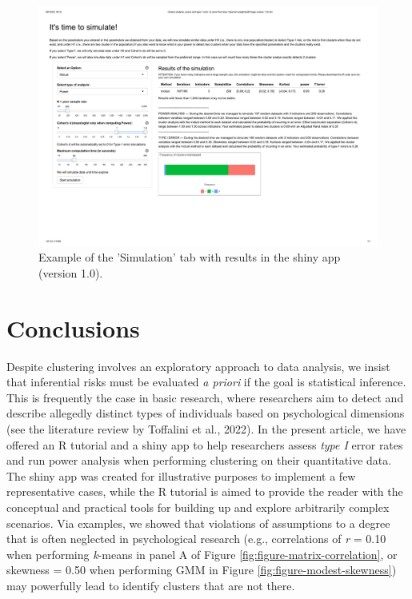 \documentclass[
  man,floatsintext]{apa6}
\begin{document}
\begin{figure}

{\centering \includegraphics[width=1\linewidth]{figures_external/Figure_Simulation_shiny} 

}

\caption{Example of the 'Simulation' tab with results in the shiny app (version 1.0).}\label{fig:figure-simulation-shiny}
\end{figure}

\hypertarget{conclusions}{%
\section{Conclusions}\label{conclusions}}

Despite clustering involves an exploratory approach to data analysis, we insist that inferential risks must be evaluated \emph{a priori} if the goal is statistical inference. This is frequently the case in basic research, where researchers aim to detect and describe allegedly distinct types of individuals based on psychological dimensions (see the literature review by Toffalini et al., 2022). In the present article, we have offered an R tutorial and a shiny app to help researchers assess \emph{type I} error rates and run power analysis when performing clustering on their quantitative data. The shiny app was created for illustrative purposes to implement a few representative cases, while the R tutorial is aimed to provide the reader with the conceptual and practical tools for building up and explore arbitrarily complex scenarios. Via examples, we showed that violations of assumptions to a degree that is often neglected in psychological research (e.g., correlations of \emph{r} = 0.10 when performing \emph{k}-means in panel A of Figure \ref{fig:figure-matrix-correlation}, or skewness = 0.50 when performing GMM in Figure \ref{fig:figure-modest-skewness}) may powerfully lead to identify clusters that are not there.
\end{document}
